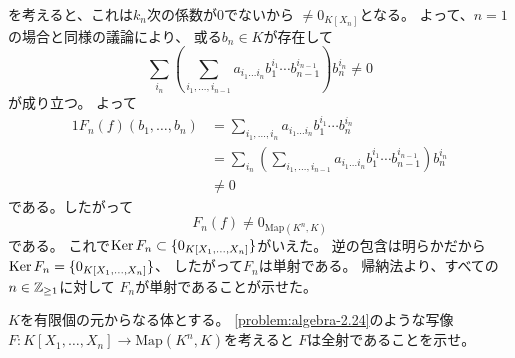 \documentclass[report]{jlreq}
\begin{document}
\begin{answer}
    を考えると、これは$k_n$次の係数が$0$でないから
    $\neq 0_{K[X_n]}$となる。
    よって、$n = 1$の場合と同様の議論により、
    或る$b_n \in K$が存在して
    \begin{equation}
        \sum_{i_n} \left(
            \sum_{i_1, \dots, i_{n - 1}}
                a_{i_1 \dots i_n} b_1^{i_1} \cdots b_{n - 1}^{i_{n - 1}}
        \right) b_n^{i_n}
        \neq 0
    \end{equation}
    が成り立つ。
    よって
    \begin{alignat}{1}
        F_n(f) (b_1, \dots, b_n)
            &= \sum_{i_1, \dots, i_n}
                a_{i_1 \dots i_n} b_1^{i_1} \cdots b_n^{i_n} \\
            &= \sum_{i_n} \left(
                \sum_{i_1, \dots, i_{n - 1}}
                    a_{i_1 \dots i_n} b_1^{i_1} \cdots b_{n - 1}^{i_{n - 1}}
            \right) b_n^{i_n} \\
            &\neq 0
    \end{alignat}
    である。したがって
    \begin{equation}
        F_n(f) \neq 0_{\mathrm{Map}(K^n, K)}
    \end{equation}
    である。
    これで$\operatorname{\mathrm{Ker}} F_n \subset \{ 0_{K[X_1, \dots, X_n]} \}$がいえた。
    逆の包含は明らかだから$\operatorname{\mathrm{Ker}} F_n = \{ 0_{K[X_1, \dots, X_n]} \}$、
    したがって$F_n$は単射である。
    帰納法より、すべての$n \in \mathbb{Z}_{\ge 1}$に対して
    $F_n$が単射であることが示せた。
\end{answer}


\begin{problem}[代数学II 2.25]
    $K$を有限個の元からなる体とする。
    \cref{problem:algebra-2.24}のような写像
    $F \colon K[X_1, \dots, X_n] \to \mathrm{Map}(K^n, K)$を考えると
    $F$は全射であることを示せ。
\end{problem}
\end{document}
